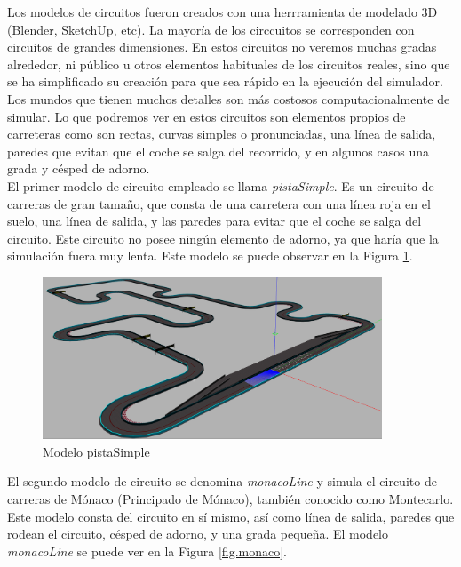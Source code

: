 Los modelos de circuitos fueron creados con una herrramienta de modelado 3D (Blender, SketchUp, etc). La mayoría de los circcuitos se corresponden con circuitos de grandes dimensiones. En estos circuitos no veremos muchas gradas alrededor, ni público u otros elementos habituales de los circuitos reales, sino que se ha simplificado su creación para que sea rápido en la ejecución del simulador. Los mundos que tienen muchos detalles son más costosos computacionalmente de simular. Lo que podremos ver en estos circuitos son elementos propios de carreteras como son rectas, curvas simples o pronunciadas, una línea de salida, paredes que evitan que el coche se salga del recorrido, y en algunos casos una grada y césped de adorno.\\

El primer modelo de circuito empleado se llama \textit{pistaSimple}. Es un circuito de carreras de gran tamaño, que consta de una carretera con una línea roja en el suelo, una línea de salida, y las paredes para evitar que el coche se salga del circuito. Este circuito no posee ningún elemento de adorno, ya que haría que la simulación fuera muy lenta. Este modelo se puede observar en la Figura \ref{fig.simple}.\\

\begin{figure}
  \begin{center}
    \includegraphics[width=0.9\textwidth]{figures/Infraestructura/circuit_Simple.png}
		\caption{Modelo pistaSimple}
		\label{fig.simple}
		\end{center}
\end{figure}

El segundo modelo de circuito se denomina \textit{monacoLine} y simula el circuito de carreras de Mónaco (Principado de Mónaco), también conocido como Montecarlo. Este modelo consta del circuito en sí mismo, así como línea de salida, paredes que rodean el circuito, césped de adorno, y una grada pequeña. El modelo \textit{monacoLine} se puede ver en la Figura \ref{fig.monaco}.\\


